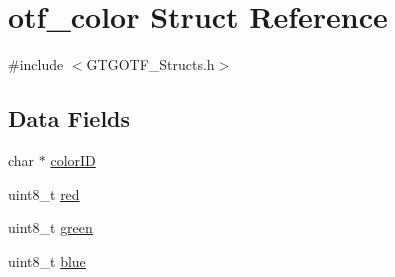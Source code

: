 \hypertarget{structotf__color}{\section{otf\-\_\-color Struct Reference}
\label{structotf__color}
}


{\ttfamily \#include $<$G\-T\-G\-O\-T\-F\-\_\-\-Structs.\-h$>$}

\subsection*{Data Fields}
\begin{DoxyCompactItemize}
\item 
char $\ast$ \hyperlink{structotf__color_a2b4dac25aa93f339f7f133befbafc144}{color\-I\-D}
\item 
uint8\-\_\-t \hyperlink{structotf__color_af3ff520576ee8bccf9d2bc85614e9501}{red}
\item 
uint8\-\_\-t \hyperlink{structotf__color_aab6d70bd00e226b845719f7363cbb809}{green}
\item 
uint8\-\_\-t \hyperlink{structotf__color_ae6e59a72e6d53e8f13916deafacc52f6}{blue}
\end{DoxyCompactItemize}


